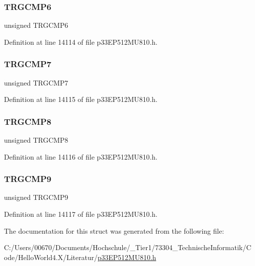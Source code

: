 \subsubsection{\texorpdfstring{T\+R\+G\+C\+M\+P6}{TRGCMP6}}
{\footnotesize\ttfamily unsigned T\+R\+G\+C\+M\+P6}



Definition at line 14114 of file p33\+E\+P512\+M\+U810.\+h.

\mbox{\label{structtag_t_r_i_g1_b_i_t_s_aa801131b5ab0b542a360d202275ea4fd}} 
\subsubsection{\texorpdfstring{T\+R\+G\+C\+M\+P7}{TRGCMP7}}
{\footnotesize\ttfamily unsigned T\+R\+G\+C\+M\+P7}



Definition at line 14115 of file p33\+E\+P512\+M\+U810.\+h.

\mbox{\label{structtag_t_r_i_g1_b_i_t_s_a7d4f3ec40334f00592eb7247457e2fd6}} 
\subsubsection{\texorpdfstring{T\+R\+G\+C\+M\+P8}{TRGCMP8}}
{\footnotesize\ttfamily unsigned T\+R\+G\+C\+M\+P8}



Definition at line 14116 of file p33\+E\+P512\+M\+U810.\+h.

\mbox{\label{structtag_t_r_i_g1_b_i_t_s_a0001e7efb9031bef24e7a19100d11b0b}} 
\subsubsection{\texorpdfstring{T\+R\+G\+C\+M\+P9}{TRGCMP9}}
{\footnotesize\ttfamily unsigned T\+R\+G\+C\+M\+P9}



Definition at line 14117 of file p33\+E\+P512\+M\+U810.\+h.



The documentation for this struct was generated from the following file\+:\begin{DoxyCompactItemize}
\item 
C\+:/\+Users/00670/\+Documents/\+Hochschule/\+\_\+\+Tier1/73304\+\_\+\+Technische\+Informatik/\+Code/\+Hello\+World4.\+X/\+Literatur/\hyperlink{p33_e_p512_m_u810_8h}{p33\+E\+P512\+M\+U810.\+h}\end{DoxyCompactItemize}
